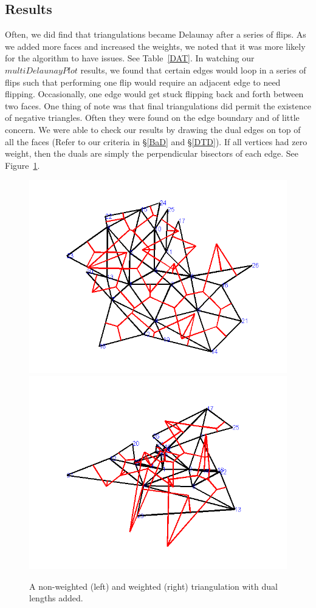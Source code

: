 \documentclass[12pt]{article}
\begin{document}
\subsection{Results}
 Often, we did find that triangulations became Delaunay after a series of flips. As we added more faces and increased the weights, we noted that it was more likely for the algorithm to have issues. See Table~\ref{DAT}. In watching our $multiDelaunayPlot$ results, we found that certain edges would loop in a series of flips such that performing one flip would require an adjacent edge to need flipping. Occasionally, one edge would get stuck flipping back and forth between two faces. One thing of note was that final triangulations did permit the existence of negative triangles. Often they were found on the edge boundary and of little concern. We were able to check our results by drawing the dual edges on top of all the faces (Refer to our criteria in \S\ref{BaD} and \S\ref{DTD}). If all vertices had zero weight, then the duals are simply the perpendicular bisectors of each edge. See Figure~\ref{Duals}. 

\begin{figure}
\centering
\includegraphics[scale = .45]{Pictures3/nonwduals.png}
\includegraphics[scale = .45]{Pictures3/Wduals.png}
\caption{A non-weighted (left) and weighted (right) triangulation with dual lengths added.}
\label{Duals}
\end{figure}
\end{document}
